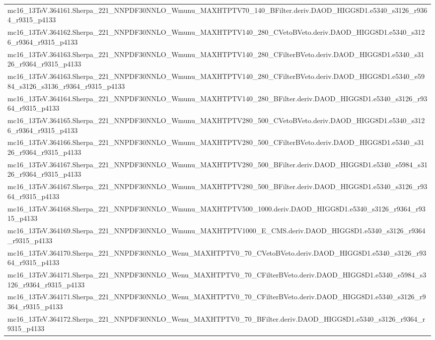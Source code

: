 \begin{adjustwidth}{-3em}{-3em}
\begin{longtable}{l}
mc16\_13TeV.364161.Sherpa\_221\_NNPDF30NNLO\_Wmunu\_MAXHTPTV70\_140\_BFilter.deriv.DAOD\_HIGG8D1.e5340\_s3126\_r9364\_r9315\_p4133 \\
mc16\_13TeV.364162.Sherpa\_221\_NNPDF30NNLO\_Wmunu\_MAXHTPTV140\_280\_CVetoBVeto.deriv.DAOD\_HIGG8D1.e5340\_s3126\_r9364\_r9315\_p4133 \\
mc16\_13TeV.364163.Sherpa\_221\_NNPDF30NNLO\_Wmunu\_MAXHTPTV140\_280\_CFilterBVeto.deriv.DAOD\_HIGG8D1.e5340\_s3126\_r9364\_r9315\_p4133 \\
mc16\_13TeV.364163.Sherpa\_221\_NNPDF30NNLO\_Wmunu\_MAXHTPTV140\_280\_CFilterBVeto.deriv.DAOD\_HIGG8D1.e5340\_e5984\_s3126\_s3136\_r9364\_r9315\_p4133 \\
mc16\_13TeV.364164.Sherpa\_221\_NNPDF30NNLO\_Wmunu\_MAXHTPTV140\_280\_BFilter.deriv.DAOD\_HIGG8D1.e5340\_s3126\_r9364\_r9315\_p4133 \\
mc16\_13TeV.364165.Sherpa\_221\_NNPDF30NNLO\_Wmunu\_MAXHTPTV280\_500\_CVetoBVeto.deriv.DAOD\_HIGG8D1.e5340\_s3126\_r9364\_r9315\_p4133 \\
mc16\_13TeV.364166.Sherpa\_221\_NNPDF30NNLO\_Wmunu\_MAXHTPTV280\_500\_CFilterBVeto.deriv.DAOD\_HIGG8D1.e5340\_s3126\_r9364\_r9315\_p4133 \\
mc16\_13TeV.364167.Sherpa\_221\_NNPDF30NNLO\_Wmunu\_MAXHTPTV280\_500\_BFilter.deriv.DAOD\_HIGG8D1.e5340\_e5984\_s3126\_r9364\_r9315\_p4133 \\
mc16\_13TeV.364167.Sherpa\_221\_NNPDF30NNLO\_Wmunu\_MAXHTPTV280\_500\_BFilter.deriv.DAOD\_HIGG8D1.e5340\_s3126\_r9364\_r9315\_p4133 \\
mc16\_13TeV.364168.Sherpa\_221\_NNPDF30NNLO\_Wmunu\_MAXHTPTV500\_1000.deriv.DAOD\_HIGG8D1.e5340\_s3126\_r9364\_r9315\_p4133 \\
mc16\_13TeV.364169.Sherpa\_221\_NNPDF30NNLO\_Wmunu\_MAXHTPTV1000\_E\_CMS.deriv.DAOD\_HIGG8D1.e5340\_s3126\_r9364\_r9315\_p4133 \\
mc16\_13TeV.364170.Sherpa\_221\_NNPDF30NNLO\_Wenu\_MAXHTPTV0\_70\_CVetoBVeto.deriv.DAOD\_HIGG8D1.e5340\_s3126\_r9364\_r9315\_p4133 \\
mc16\_13TeV.364171.Sherpa\_221\_NNPDF30NNLO\_Wenu\_MAXHTPTV0\_70\_CFilterBVeto.deriv.DAOD\_HIGG8D1.e5340\_e5984\_s3126\_r9364\_r9315\_p4133 \\
mc16\_13TeV.364171.Sherpa\_221\_NNPDF30NNLO\_Wenu\_MAXHTPTV0\_70\_CFilterBVeto.deriv.DAOD\_HIGG8D1.e5340\_s3126\_r9364\_r9315\_p4133 \\
mc16\_13TeV.364172.Sherpa\_221\_NNPDF30NNLO\_Wenu\_MAXHTPTV0\_70\_BFilter.deriv.DAOD\_HIGG8D1.e5340\_s3126\_r9364\_r9315\_p4133 \\

\end{longtable}
\end{adjustwidth}
